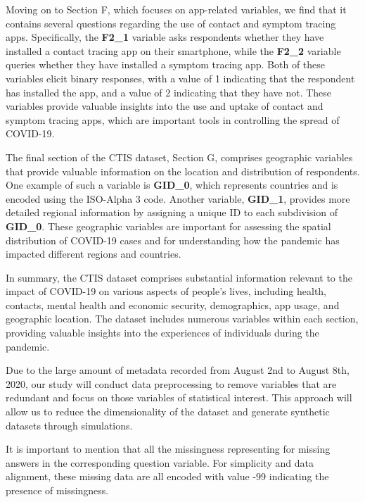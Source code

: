 Moving on to Section F, which focuses on app-related variables, we find that it contains several questions regarding the use of contact and symptom tracing apps. Specifically, the \textbf{F2\_1} variable asks respondents whether they have installed a contact tracing app on their smartphone, while the \textbf{F2\_2} variable queries whether they have installed a symptom tracing app. Both of these variables elicit binary responses, with a value of 1 indicating that the respondent has installed the app, and a value of 2 indicating that they have not. These variables provide valuable insights into the use and uptake of contact and symptom tracing apps, which are important tools in controlling the spread of COVID-19.

The final section of the CTIS dataset, Section G, comprises geographic variables that provide valuable information on the location and distribution of respondents. One example of such a variable is \textbf{GID\_0}, which represents countries and is encoded using the ISO-Alpha 3 code. Another variable, \textbf{GID\_1}, provides more detailed regional information by assigning a unique ID to each subdivision of \textbf{GID\_0}. These geographic variables are important for assessing the spatial distribution of COVID-19 cases and for understanding how the pandemic has impacted different regions and countries.

In summary, the CTIS dataset comprises substantial information relevant to the impact of COVID-19 on various aspects of people's lives, including health, contacts, mental health and economic security, demographics, app usage, and geographic location. The dataset includes numerous variables within each section, providing valuable insights into the experiences of individuals during the pandemic.

Due to the large amount of metadata recorded from August 2nd to August 8th, 2020, our study will conduct data preprocessing to remove variables that are redundant and focus on those variables of statistical interest. This approach will allow us to reduce the dimensionality of the dataset and generate synthetic datasets through simulations.

It is important to mention that all the missingness representing for missing answers in the corresponding question variable. For simplicity and data alignment, these missing data are all encoded with value -99 indicating the presence of missingness.





